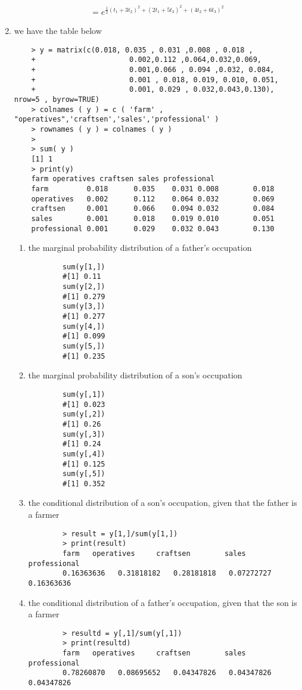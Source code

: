 \documentclass[11pt]{article}
\begin{document}
\begin{enumerate}
\begin{gather}
	=e^{\frac{1}{2} (t_1+3t_2)^2+(2t_1+5t_3)^2 + (4t_2+6t_3)^2}
\end{gather}
\item we have the table below
\begin{verbatim}
	> y = matrix(c(0.018, 0.035 , 0.031 ,0.008 , 0.018 ,
	+                      0.002,0.112 ,0.064,0.032,0.069,
	+                      0.001,0.066 , 0.094 ,0.032, 0.084,
	+                      0.001 , 0.018, 0.019, 0.010, 0.051,
	+                      0.001, 0.029 , 0.032,0.043,0.130), nrow=5 , byrow=TRUE)
	> colnames ( y ) = c ( 'farm' , "operatives",'craftsen','sales','professional' )
	> rownames ( y ) = colnames ( y )
	> 
	> sum( y )
	[1] 1
	> print(y)
	farm operatives craftsen sales professional
	farm         0.018      0.035    0.031 0.008        0.018
	operatives   0.002      0.112    0.064 0.032        0.069
	craftsen     0.001      0.066    0.094 0.032        0.084
	sales        0.001      0.018    0.019 0.010        0.051
	professional 0.001      0.029    0.032 0.043        0.130
\end{verbatim}
\begin{enumerate}
	\item the marginal probability distribution of a father’s occupation
	\begin{verbatim}
		sum(y[1,])
		#[1] 0.11
		sum(y[2,])
		#[1] 0.279
		sum(y[3,])
		#[1] 0.277
		sum(y[4,])
		#[1] 0.099
		sum(y[5,])
		#[1] 0.235
	\end{verbatim}
	\item the marginal probability distribution of a son’s occupation
	\begin{verbatim}
		sum(y[,1])
		#[1] 0.023
		sum(y[,2])
		#[1] 0.26
		sum(y[,3])
		#[1] 0.24
		sum(y[,4])
		#[1] 0.125
		sum(y[,5])
		#[1] 0.352
	\end{verbatim}
	\item the conditional distribution of a son’s occupation, given that the father is a farmer
	\begin{verbatim}
		> result = y[1,]/sum(y[1,])
		> print(result)
		farm   operatives     craftsen        sales professional 
		0.16363636   0.31818182   0.28181818   0.07272727   0.16363636 
	\end{verbatim}
	\item the conditional distribution of a father’s occupation, given that the son is a farmer
	\begin{verbatim}
		> resultd = y[,1]/sum(y[,1])
		> print(resultd)
		farm   operatives     craftsen        sales professional 
		0.78260870   0.08695652   0.04347826   0.04347826   0.04347826 

\end{verbatim}
\end{enumerate}
\end{enumerate}
\end{document}
